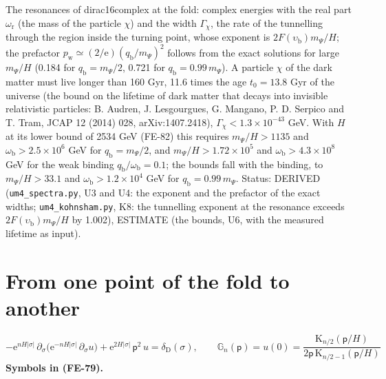 \documentclass[
  10pt,
]{article}
\begin{document}
The resonances of dirac16complex at the fold: complex energies with the
real part \(\omega_{\mathrm{r}}\) (the mass of the particle \(\chi\))
and the width \(\Gamma_\chi\), the rate of the tunnelling through the
region inside the turning point, whose exponent is
\(2F(\upsilon_{\mathrm{b}})m_\Psi/H\); the prefactor
\(p_{\mathrm{w}} \simeq (2/\mathrm{e})(q_{\mathrm{b}}/m_\Psi)^2\)
follows from the exact solutions for large \(m_\Psi/H\) (0.184 for
\(q_{\mathrm{b}} = m_\Psi/2\), 0.721 for
\(q_{\mathrm{b}} = 0.99\,m_\Psi\)). A particle \(\chi\) of the dark
matter must live longer than 160 Gyr, 11.6 times the age \(t_0 = 13.8\)
Gyr of the universe (the bound on the lifetime of dark matter that
decays into invisible relativistic particles: B. Audren, J. Lesgourgues,
G. Mangano, P. D. Serpico and T. Tram, JCAP 12 (2014) 028,
arXiv:1407.2418), \(\Gamma_\chi < 1.3\times10^{-43}\) GeV. With \(H\) at
its lower bound of 2534 GeV (FE-82) this requires \(m_\Psi/H > 1135\)
and \(\omega_{\mathrm{b}} > 2.5\times10^6\) GeV for
\(q_{\mathrm{b}} = m_\Psi/2\), and \(m_\Psi/H > 1.72\times10^5\) and
\(\omega_{\mathrm{b}} > 4.3\times10^8\) GeV for the weak binding
\(q_{\mathrm{b}}/\omega_{\mathrm{b}} = 0.1\); the bounds fall with the
binding, to \(m_\Psi/H > 33.1\) and
\(\omega_{\mathrm{b}} > 1.2\times10^4\) GeV for
\(q_{\mathrm{b}} = 0.99\,m_\Psi\). Status: DERIVED
(\texttt{um4\_spectra.py}, U3 and U4: the exponent and the prefactor of
the exact widths; \texttt{um4\_kohnsham.py}, K8: the tunnelling exponent
at the resonance exceeds \(2F(\upsilon_{\mathrm{b}})m_\Psi/H\) by
1.002), ESTIMATE (the bounds, U6, with the measured lifetime as input).

\hypertarget{from-one-point-of-the-fold-to-another}{%
\section{From one point of the fold to
another}\label{from-one-point-of-the-fold-to-another}}

\[
-\mathrm{e}^{nH\lvert\sigma\rvert}\,\partial_\sigma\big(\mathrm{e}^{-nH\lvert\sigma\rvert}\,\partial_\sigma u\big)
 + \mathrm{e}^{2H\lvert\sigma\rvert}\,\mathsf{p}^2\,u = \delta_{\mathrm{D}}(\sigma),\qquad
\mathbb{G}_n(\mathsf{p}) = u(0) = \frac{\mathrm{K}_{n/2}(\mathsf{p}/H)}{2\mathsf{p}\,\mathrm{K}_{n/2-1}(\mathsf{p}/H)} \tag{FE-79}
\] \textbf{Symbols in (FE-79).}
\end{document}
